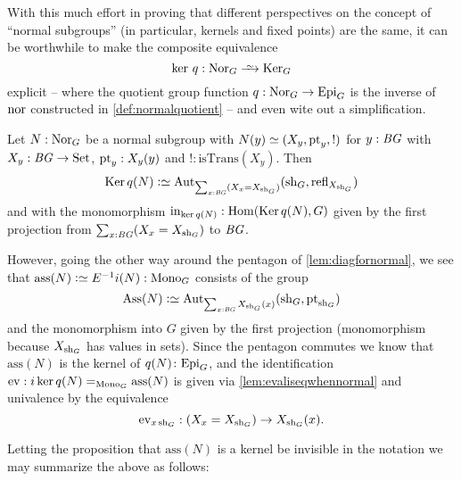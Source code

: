 With this much effort in proving that different perspectives on the concept of ``normal subgroups'' (in particular, kernels and fixed points) are the same, it can be worthwhile to make the composite equivalence
$$\ker\,q:\typenormal_G\we\typekernel_G$$
explicit -- where the quotient group function $q:\mathrm{Nor}_G\to\mathrm{Epi}_G$ is the inverse of $\nor$ constructed in \cref{def:normalquotient} --  and even wite out a simplification.

Let $N:\mathrm{Nor}_G$ be a normal subgroup with $N(y)\oldequiv (X_y,\pt_y,!)$ for $y:\mathit{B}\mathit{G}$ with $X_y:\mathit{B}\mathit{G}\to\mathrm{Set}$, $\mathrm{pt}_y:X_y(y)$ and $!:\mathrm{isTrans}(X_y)$.
Then
$$\Ker q(N)\defequi\aut_{\sum_{x:\BG}(X_x=X_{\shape_G})}(\shape_G,\refl{X_{\shape_G}})
$$
and with the monomorphism $\incl_{\ker q(N)}:\Hom(\Ker q(N),G)$ given by the first projection from $\sum_{x:\mathit{B}\mathit{G}}(X_x=X_{\mathrm{sh}_G})$ to $\mathit{B}\mathit{G}$.

However, going the other way around the pentagon of \cref{lem:diagfornormal}, we see that $\mathrm{ass}(N)\defequi E^{-1}i(N):\typemono_G$ consists of the group
$$\mathrm{Ass}(N)\defequi\aut_{\sum_{x:\BG}X_{\shape_G}(x)}(\shape_G,\pt_{\shape_G})
$$
and the monomorphism into $G$ given by the first projection (monomorphism because $X_{\mathrm{sh}_G}$ has values in sets).  Since the pentagon commutes we know that $\mathrm{ass}(N)$ is the kernel of $q(N)\colon\mathrm{Epi}_G$, and the identification $\mathrm{ev}:i\ker q(N)=_{\typemono_G}\mathrm{ass}(N)$ is given via \cref{lem:evaliseqwhennormal} and univalence by the equivalence
$$\mathrm{ev}_{x\,\shape_G}:(X_x=X_{\shape_G})\to X_{\shape_G}(x)%
.$$



Letting the proposition that $\mathrm{ass}(N)$ is a kernel be invisible in the notation we may summarize the above as follows:


